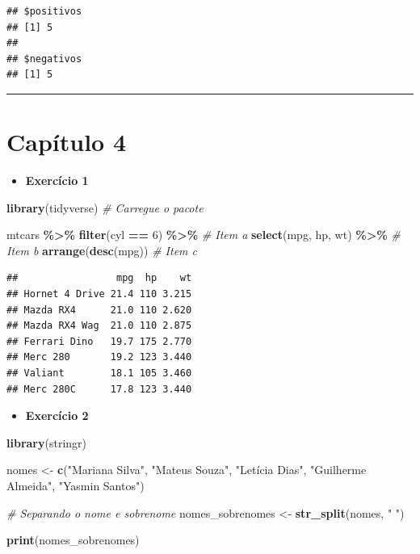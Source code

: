 \documentclass[
]{book}
\newenvironment{Shaded}{\begin{snugshade}}{\end{snugshade}}
\newcommand{\CommentTok}[1]{\textcolor[rgb]{0.56,0.35,0.01}{\textit{#1}}}
\newcommand{\DecValTok}[1]{\textcolor[rgb]{0.00,0.00,0.81}{#1}}
\newcommand{\FunctionTok}[1]{\textcolor[rgb]{0.13,0.29,0.53}{\textbf{#1}}}
\newcommand{\NormalTok}[1]{#1}
\newcommand{\OtherTok}[1]{\textcolor[rgb]{0.56,0.35,0.01}{#1}}
\newcommand{\SpecialCharTok}[1]{\textcolor[rgb]{0.81,0.36,0.00}{\textbf{#1}}}
\newcommand{\StringTok}[1]{\textcolor[rgb]{0.31,0.60,0.02}{#1}}
\providecommand{\tightlist}{%
  \setlength{\itemsep}{0pt}\setlength{\parskip}{0pt}}
\begin{document}
\begin{verbatim}
## $positivos
## [1] 5
## 
## $negativos
## [1] 5
\end{verbatim}

\begin{center}\rule{0.5\linewidth}{0.5pt}\end{center}

\section{Capítulo 4}\label{capuxedtulo-4}

\begin{itemize}
\tightlist
\item
  \textbf{Exercício 1}
\end{itemize}

\begin{Shaded}
\begin{Highlighting}[]
\FunctionTok{library}\NormalTok{(tidyverse) }\CommentTok{\# Carregue o pacote}

\NormalTok{mtcars }\SpecialCharTok{\%\textgreater{}\%} 
  \FunctionTok{filter}\NormalTok{(cyl }\SpecialCharTok{==} \DecValTok{6}\NormalTok{) }\SpecialCharTok{\%\textgreater{}\%} \CommentTok{\# Item a}
  \FunctionTok{select}\NormalTok{(mpg, hp, wt) }\SpecialCharTok{\%\textgreater{}\%} \CommentTok{\# Item b}
  \FunctionTok{arrange}\NormalTok{(}\FunctionTok{desc}\NormalTok{(mpg)) }\CommentTok{\# Item c}
\end{Highlighting}
\end{Shaded}

\begin{verbatim}
##                 mpg  hp    wt
## Hornet 4 Drive 21.4 110 3.215
## Mazda RX4      21.0 110 2.620
## Mazda RX4 Wag  21.0 110 2.875
## Ferrari Dino   19.7 175 2.770
## Merc 280       19.2 123 3.440
## Valiant        18.1 105 3.460
## Merc 280C      17.8 123 3.440
\end{verbatim}

\begin{itemize}
\tightlist
\item
  \textbf{Exercício 2}
\end{itemize}

\begin{Shaded}
\begin{Highlighting}[]
\FunctionTok{library}\NormalTok{(stringr)}

\NormalTok{nomes }\OtherTok{\textless{}{-}} \FunctionTok{c}\NormalTok{(}\StringTok{"Mariana Silva"}\NormalTok{, }\StringTok{"Mateus Souza"}\NormalTok{, }\StringTok{"Letícia Dias"}\NormalTok{, }\StringTok{"Guilherme Almeida"}\NormalTok{, }
           \StringTok{"Yasmin Santos"}\NormalTok{)}

\CommentTok{\# Separando o nome e sobrenome}
\NormalTok{nomes\_sobrenomes }\OtherTok{\textless{}{-}} \FunctionTok{str\_split}\NormalTok{(nomes, }\StringTok{" "}\NormalTok{)}

\FunctionTok{print}\NormalTok{(nomes\_sobrenomes)}
\end{Highlighting}
\end{Shaded}
\end{document}
